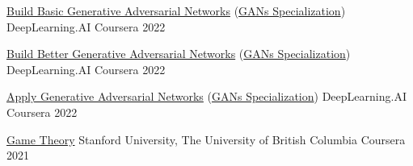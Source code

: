 
\newcommand{\dlspec}{\href{https://www.coursera.org/account/accomplishments/specialization/certificate/3DWHZC46YSCK}{Deep Learning Specialization}}

\newcommand{\ganspec}{\href{https://www.coursera.org/account/accomplishments/specialization/certificate/WT5VCNDDCB7V}{GANs Specialization}}


\begin{cvhonors}


  \cvhonor
    {\href{https://www.coursera.org/account/accomplishments/certificate/BX8G5BY5Y4DL}{Build Basic Generative Adversarial Networks} (\ganspec)} %
    {DeepLearning.AI} %
    {Coursera} %
    {2022} %

  \cvhonor
    {\href{https://www.coursera.org/account/accomplishments/certificate/KUTVDLKQCM5F}{Build Better Generative Adversarial Networks} (\ganspec)} %
    {DeepLearning.AI} %
    {Coursera} %
    {2022} %

  \cvhonor
    {\href{https://www.coursera.org/account/accomplishments/certificate/2WJKAHRMERXT}{Apply Generative Adversarial Networks} (\ganspec)} %
    {DeepLearning.AI} %
    {Coursera} %
    {2022} %


  \cvhonor
    {\href{https://www.coursera.org/account/accomplishments/certificate/ZVWNNHWAJUWC}{Game Theory}} %
    {Stanford University, The University of British Columbia} %
    {Coursera} %
    {2021} %



\end{cvhonors}

